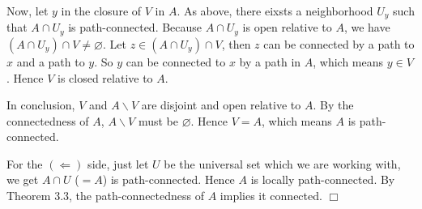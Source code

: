 \documentclass{article}
\begin{document}
Now, let $y$ in the closure of $V$ in $A$. As above, there eixsts a
neighborhood $U_y$ such that $A\cap U_y$ is path-connected. Because
$A\cap U_y$ is open relative to $A$, we have
$(A\cap U_y)\cap  V \neq \varnothing$. Let $z\in (A\cap U_y)\cap  V$,
then $z$ can be connected by a path to $x$ and a path to $y$. So $y$ can
be connected to $x$ by a path in $A$, which means $y \in V$. Hence $V$
is closed relative to $A$.

In conclusion, $V$ and $A\backslash V$ are disjoint and open relative to
$A$. By the connectedness of $A$, $A\backslash V$ must be $\varnothing$.
Hence $V = A$, which means $A$ is path-connected.

For the $(\Leftarrow)$ side, just let $U$ be the universal set which we
are working with, we get $A\cap U$ ($=A$) is path-connected. Hence $A$
is locally path-connected. By Theorem 3.3, the path-connectedness of $A$
implies it connected. $\Box$


    
    
    
    
\end{document}
